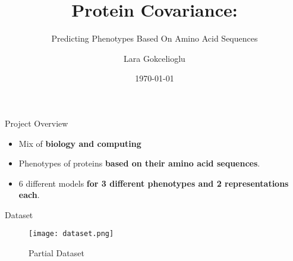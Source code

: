 \documentclass[14pt]{beamer}
\title{Protein Covariance:}
\subtitle{Predicting Phenotypes Based On Amino Acid Sequences}
\author{Lara Gokcelioglu}
\institute{Institute For Computing In Research Santa Fe}
\date{\today}
\begin{document}
\begin{frame}[plain]
\maketitle
\end{frame}

\begin{frame}{Project Overview}
 \color{colorblue}\begin{itemize}
  \item\begin{center}Mix of \color{colororange}\textbf{biology and computing}\end{center}
  \item\begin{center}Phenotypes of proteins \color{colororange}\textbf{based on their amino acid sequences}.\end{center}
  \item\begin{center}6 different models \color{colororange}\textbf{for 3 different phenotypes and 2 representations each}.\end{center}
 \end{itemize}
\end{frame}

\begin{frame}{Dataset}
 \begin{fullpageitemize}
      \item\color{colorgreen}\begin{center}\end{center}
 \end{fullpageitemize}
\end{frame}

\begin{frame}
\begin{figure}
        \centering
        \texttt{[image: dataset.png]}
        \caption{Partial Dataset}
        \label{fig:enter-label}
    \end{figure}    
\end{frame}
\end{document}
